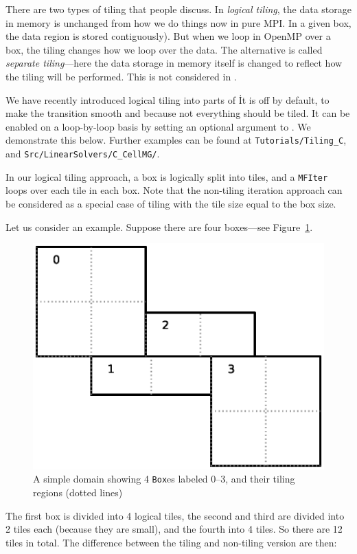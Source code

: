 There are two types of tiling that people discuss.  In {\em logical
tiling}, the data storage in memory is unchanged from how we do things
now in pure MPI.  In a given box, the data region is stored
contiguously).  But when we loop in OpenMP over a box, the tiling
changes how we loop over the data.  The alternative is called {\em
separate tiling}---here the data storage in memory itself is changed
to reflect how the tiling will be performed.  This is not considered
in \boxlib.

We have recently introduced logical tiling into parts of \boxlib\.  It
is off by default, to make the transition smooth and because not
everything should be tiled.  It can be enabled on a loop-by-loop basis
by setting an optional argument to \mfiter.  We demonstrate this
below.  Further examples can be found at {\tt Tutorials/Tiling\_C},
and {\tt Src/LinearSolvers/C\_CellMG/}.

In our logical tiling approach, a box is logically split into tiles,
and a {\tt MFIter} loops over each tile in each box.  Note that the
non-tiling iteration approach can be considered as a special case of
tiling with the tile size equal to the box size.

Let us consider an example.  Suppose there are four boxes---see
Figure~\ref{fig:domain-tiling}.
\begin{figure}[t]
\centering
\includegraphics[width=0.8\linewidth]{domain-tile}
\caption{\label{fig:domain-tiling} A simple domain showing 4
  {\tt Box}es labeled 0--3, and their tiling regions (dotted lines)}
\end{figure}
%
The first box is divided into 4 logical tiles, the second and third
are divided into 2 tiles each (because they are small), and the fourth
into 4 tiles.  So there are 12 tiles in total.  The difference between
the tiling and non-tiling version are then:

